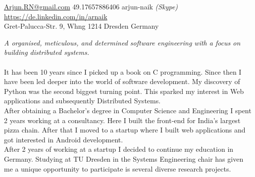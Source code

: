 \documentclass[10pt,a4paper]{article}
\begin{document}
\sloppy  %


\nobreakvspace{0.3em}  %

\noindent\href{mailto:Arjun.RN@gmail.com}{Arjun.RN\mbox{}@\mbox{}gmail.com}\sbull
\textsmaller{+}49.17657886406
\sbull arjun-naik \emph{(Skype)}
\\
\sbull
\href{https://de.linkedin.com/in/arnaik}{https://de.linkedin.com/in/arnaik}
\\
Gret-Palucca-Str. 9, Whng 1214\sbull
Dresden\sbull
Germany

\spacedhrule{0.9em}{-0.4em}  %


\vspace{-1.3em}  %
\begin{multicols}{2}  %
\noindent \emph{A organised, meticulous, and determined software engineering with a focus on building distributed systems.}
\\
\\
It has been 10 years since I picked up a book on C programming. Since then I have been led deeper into the world of software development. My discovery of Python was the second biggest turning point. This sparked my interest in Web applications and subsequently Distributed Systems. 
\\
After obtaining a Bachelor's degree in Computer Science and Engineering I spent 2 years working at a consultancy. Here I built the front-end for India's largest pizza chain. After that I moved to a startup where I built web applications and got interested in Android development. 
\\
After 2 years of working at a startup I decided to continue my education in Germany. Studying at TU Dresden in the Systems Engineering chair has given me a unique opportunity to participate is several diverse research projects.
\\

\end{multicols}
\end{document}

